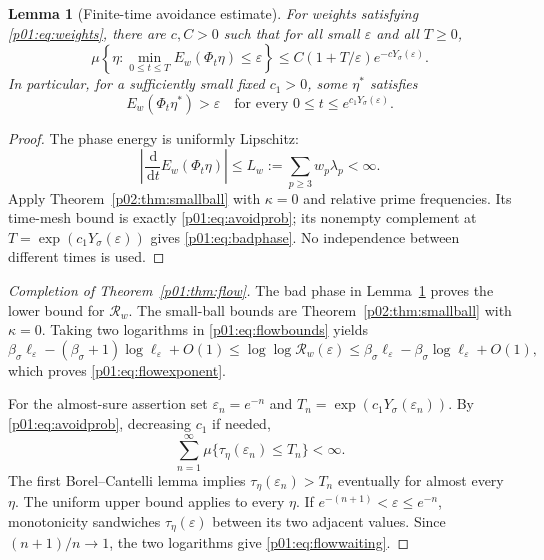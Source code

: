 \documentclass[11pt,letterpaper]{article}
\newtheorem{lemma}[theorem]{Lemma}
\theoremstyle{definition}
\theoremstyle{remark}
\newcommand{\eps}{\varepsilon}
\newcommand{\dd}{\,\mathrm d}
\newcommand{\1}{\mathbf 1}
\begin{document}
\begin{lemma}[Finite-time avoidance estimate]\label{p01:lem:avoidance}
For weights satisfying \eqref{p01:eq:weights}, there are $c,C>0$ such that
for all small $\eps$ and all $T\ge0$,
\begin{equation}\label{p01:eq:avoidprob}
 \mu\left\{\eta:\min_{0\le t\le T}E_w(\Phi_t\eta)\le\eps\right\}
 \le C(1+T/\eps)e^{-cY_\sigma(\eps)}.
\end{equation}
In particular, for a sufficiently small fixed $c_1>0$, some $\eta^*$
satisfies
\begin{equation}\label{p01:eq:badphase}
 E_w(\Phi_t\eta^*)>\eps
 \quad\text{for every }0\le t\le e^{c_1Y_\sigma(\eps)}.
\end{equation}
\end{lemma}
\begin{proof}
The phase energy is uniformly Lipschitz:
\begin{equation}\label{p01:eq:lipschitz}
 \left|\frac{\dd}{\dd t}E_w(\Phi_t\eta)\right|
 \le L_w:=\sum_{p\ge3}w_p\lambda_p<\infty.
\end{equation}
Apply Theorem~\ref{p02:thm:smallball} with $\kappa=0$ and relative
prime frequencies. Its time-mesh bound is exactly
\eqref{p01:eq:avoidprob}; its nonempty complement at
$T=\exp(c_1Y_\sigma(\eps))$ gives \eqref{p01:eq:badphase}.
No independence between different times is used.
\end{proof}

\begin{proof}[Completion of Theorem~\ref{p01:thm:flow}]
The bad phase in Lemma~\ref{p01:lem:avoidance} proves the lower bound for
$\mathcal R_w$. The small-ball bounds are Theorem~\ref{p02:thm:smallball} with $\kappa=0$. Taking
two logarithms in \eqref{p01:eq:flowbounds} yields
\[
 \beta_\sigma\ell_\eps-(\beta_\sigma+1)\log\ell_\eps+O(1)
 \le\log\log\mathcal R_w(\eps)
 \le\beta_\sigma\ell_\eps-\beta_\sigma\log\ell_\eps+O(1),
\]
which proves \eqref{p01:eq:flowexponent}.

For the almost-sure assertion set $\eps_n=e^{-n}$ and
$T_n=\exp(c_1Y_\sigma(\eps_n))$. By \eqref{p01:eq:avoidprob}, decreasing
$c_1$ if needed,
\[
 \sum_{n=1}^\infty
 \mu\{\tau_\eta(\eps_n)\le T_n\}<\infty.
\]
The first Borel--Cantelli lemma implies
$\tau_\eta(\eps_n)>T_n$ eventually for almost every $\eta$.
The uniform upper bound applies to every $\eta$.
If $e^{-(n+1)}<\eps\le e^{-n}$, monotonicity sandwiches
$\tau_\eta(\eps)$ between its two adjacent values. Since
$(n+1)/n\to1$, the two logarithms give \eqref{p01:eq:flowwaiting}.
\end{proof}
\end{document}
